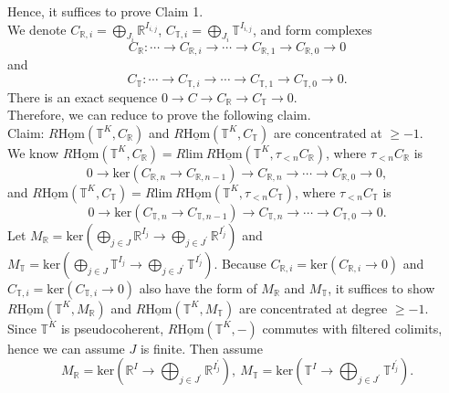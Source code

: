\documentclass[UTF8,12,a4paper]{ctexart}
\theoremstyle{definition}
\begin{document}
Hence, it suffices to prove Claim 1.\\
We denote $C_{\mathbb{R},i}=\bigoplus_{J_i}\mathbb{R}^{I_{i,j}}$, $C_{\mathbb{T},i}=\bigoplus_{J_i}\mathbb{T}^{I_{i,j}}$, and form complexes
$$
C_\mathbb{R}:\cdots \rightarrow C_{\mathbb{R},i}\rightarrow\cdots\rightarrow C_{\mathbb{R},1}\rightarrow C_{\mathbb{R},0}\rightarrow 0
$$
and
$$
C_\mathbb{T}:\cdots \rightarrow C_{\mathbb{T},i}\rightarrow\cdots\rightarrow C_{\mathbb{T},1}\rightarrow C_{\mathbb{T},0}\rightarrow 0.
$$
There is an exact sequence
$0\rightarrow C\rightarrow C_{\mathbb{R}}\rightarrow C_{\mathbb{T}}\rightarrow 0$.\\
Therefore, we can reduce to prove the following claim.\\
Claim: $R\underline{\text{Hom}}(\mathbb{T}^K,C_\mathbb{R})$ and $R\underline{\text{Hom}}(\mathbb{T}^K,C_\mathbb{T})$ are concentrated at $\geq -1$.\\
We know $R\underline{\text{Hom}}(\mathbb{T}^K,C_\mathbb{R})=R\text{lim}\ R\underline{\text{Hom}}(\mathbb{T}^K,\tau_{<n} C_\mathbb{R})$, where $\tau_{<n} C_\mathbb{R}$ is 
$$
0\rightarrow \text{ker}(C_{\mathbb{R},n}\rightarrow C_{\mathbb{R},n-1})\rightarrow C_{\mathbb{R},n}\rightarrow \cdots\rightarrow C_{\mathbb{R},0}\rightarrow 0,
$$
and 
$R\underline{\text{Hom}}(\mathbb{T}^K,C_\mathbb{T})=R\text{lim}\ R\underline{\text{Hom}}(\mathbb{T}^K,\tau_{<n} C_\mathbb{T})$, where $\tau_{<n} C_\mathbb{T}$ is 
$$
0\rightarrow \text{ker}(C_{\mathbb{T},n}\rightarrow C_{\mathbb{T},n-1})\rightarrow C_{\mathbb{T},n}\rightarrow \cdots\rightarrow C_{\mathbb{T},0}\rightarrow 0.
$$
Let $M_\mathbb{R}=\text{ker}(\bigoplus_{j\in J} \mathbb{R}^{I_j}\rightarrow \bigoplus_{j\in J^\prime} \mathbb{R}^{I_j^\prime })$ and $M_\mathbb{T}=\text{ker}(\bigoplus_{j\in J} \mathbb{T}^{I_j}\rightarrow \bigoplus_{j\in J^\prime} \mathbb{T}^{I_j^\prime })$. Because $C_{\mathbb{R},i}=\text{ker}(C_{\mathbb{R},i}\rightarrow 0)$ and $C_{\mathbb{T},i}=\text{ker}(C_{\mathbb{T},i}\rightarrow 0)$ also have the form of $M_\mathbb{R}$ and $M_\mathbb{T}$, it suffices to show 
$R\underline{\text{Hom}}(\mathbb{T}^K,M_\mathbb{R})$ and $R\underline{\text{Hom}}(\mathbb{T}^K,M_\mathbb{T})$ are concentrated at degree $\geq -1$.\\
Since $\mathbb{T}^K$ is pseudocoherent, $R\underline{\text{Hom}}(\mathbb{T}^K,-)$ commutes with filtered colimits, hence we can assume $J$ is finite. Then assume
$$
M_\mathbb{R}=\text{ker}(\mathbb{R}^{I}\rightarrow \bigoplus_{j\in J^\prime} \mathbb{R}^{I_j^\prime }),\ M_\mathbb{T}=\text{ker}(\mathbb{T}^{I}\rightarrow \bigoplus_{j\in J^\prime} \mathbb{T}^{I_j^\prime }).
$$
\end{document}
